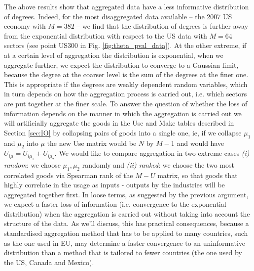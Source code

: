 The above results show that aggregated data have a less informative
distribution of degrees. Indeed, for the most disaggregated data
available -- the 2007 US economy with $M=382$ -- we find that the
distribution of degrees is further away from the exponential
distribution with respect to the US data with $M=64$ sectors (see
point US300 in Fig. \ref{fig:theta_pval_data}).  At the other extreme,
if at a certain level of aggregation the distribution is exponential,
when we aggregate further, we expect the distribution to converge to a
Gaussian limit, because the degree at the coarser level is the sum of
the degrees at the finer one. This is appropriate if the degrees are
weakly dependent random variables, which in turn depends on how the
aggregation process is carried out, i.e. which sectors are put
together at the finer scale.  To answer the question of whether the
loss of information depends on the manner in which the aggregation is
carried out we will artificially aggregate the goods in the Use and Make tables
described in Section \ref{sec:IO} by collapsing pairs of goods into a
single one, ie, if we collapse $\mu_1$ and $\mu_2$ into $\mu$ the new
Use matrix would be $N$ by $M-1$ and would have $U_{i\mu} = U_{i\mu_1}
+ U_{i\mu_2}$. We would like to compare aggregation in two extreme
cases \emph{(i) random}: we choose $\mu_1, \mu_2$ randomly and
\emph{(ii) ranked}: we choose the two most correlated goods via
Spearman rank of the $M - U$ matrix, so that goods that highly
correlate in the usage as inputs - outputs by the industries will be
aggregated together first. In loose terms, as suggested by the
previous argument, we expect a faster loss of information
(i.e. convergence to the exponential distribution) when the
aggregation is carried out without taking into account the structure
of the data. As we'll discuss, this has practical consequences,
because a standardised aggregation method that has to be applied to
many countries, such as the one used in EU, may determine a faster
convergence to an uninformative distribution than a method that is
tailored to fewer countries (the one used by the US, Canada and
Mexico).

